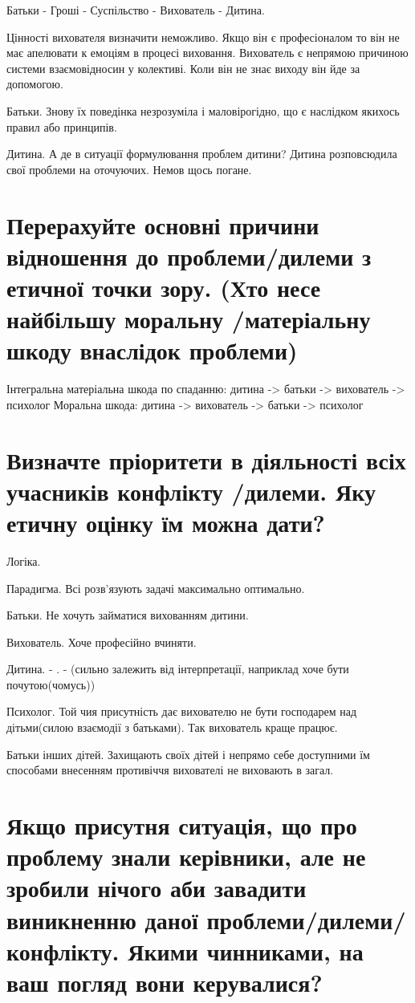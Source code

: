 \documentclass[a4paper,12pt]{article}
\begin{document}
    Батьки - Гроші - Суспільство - Вихователь - Дитина.


    Цінності вихователя визначити неможливо. Якщо він є професіоналом то він не має апелювати к емоціям в процесі виховання.
    Вихователь є непрямою причиною системи взаємовідносин у колективі. Коли він не знає виходу він йде за допомогою.

    Батьки. Знову їх поведінка незрозуміла і маловірогідно, що є наслідком якихось правил або принципів.

    Дитина. А де в ситуації формулювання проблем дитини? Дитина розповсюдила свої проблеми на оточуючих. Немов щось погане.


    \section{Перерахуйте основні причини відношення до проблеми/дилеми з етичної точки зору. (Хто несе найбільшу моральну /матеріальну шкоду внаслідок проблеми)}
    Інтегральна матеріальна шкода по спаданню: дитина -> батьки -> вихователь -> психолог
    Моральна шкода: дитина -> вихователь -> батьки -> психолог

    \section{Визначте пріоритети в діяльності всіх учасників конфлікту /дилеми. Яку етичну оцінку їм можна дати?}
    Логіка.


    Парадигма. Всі розв'язують задачі максимально оптимально.


    Батьки. Не хочуть займатися вихованням дитини.

    Вихователь. Хоче професійно вчиняти.

    Дитина. - . - (сильно залежить від інтерпретації, наприклад хоче бути почутою(чомусь))

    Психолог. Той чия присутність дає вихователю не бути господарем над дітьми(силою взаємодії з батьками). Так вихователь краще працює.

    Батьки інших дітей. Захищають своїх дітей і непрямо себе доступними їм способами внесенням противіччя вихователі не виховають в загал.

    \section{Якщо присутня ситуація, що про проблему знали керівники, але не зробили нічого аби завадити виникненню даної проблеми/дилеми/конфлікту. Якими чинниками, на ваш погляд вони керувалися?}
\end{document}
